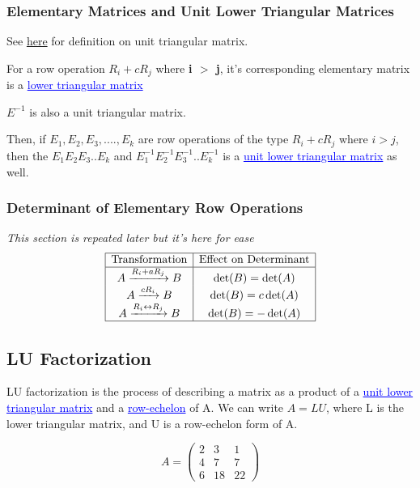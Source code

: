 \documentclass{article}
\newcommand{\bul}[1]{\textcolor{blue}{\underline{#1}}}
\newcommand{\sbreak}{\vspace{10pt}}
\newcommand{\ssbreak}{\vspace{5pt}}
\begin{document}
\subsubsection{Elementary Matrices and Unit Lower Triangular Matrices}
\label{sec:emaultm}
See \hyperref[sec:ultm]{here} for definition on unit triangular matrix.

\sbreak

For a row operation $R_i + cR_j$ where \textbf{i $>$ j}, it's corresponding elementary matrix is a \bul{lower triangular matrix}

\ssbreak

$E^{-1}$ is also a unit triangular matrix.

\ssbreak

Then, if $E_1,E_2,E_3,....,E_k$ are row operations of the type $R_i + cR_j$ where $i>j$, then the $E_1E_2E_3..E_k$ and $E_1^{-1}E_2^{-1}E_3^{-1}..E_k^{-1}$ is a \bul{unit lower triangular matrix} as well.

\subsubsection{Determinant of Elementary Row Operations}
\textit{This section is repeated later but it's here for ease}
\[
\begin{array}{|c|c|}
\hline
\text{Transformation} & \text{Effect on Determinant} \\
\hline
A \xrightarrow{R_i + aR_j} B & \det(B) = \det(A) \\
A \xrightarrow{cR_i} B & \det(B) = c \det(A) \\
A \xrightarrow{R_i \leftrightarrow R_j} B & \det(B) = - \det(A) \\
\hline
\end{array}
\]

\subsection{LU Factorization}
LU factorization is the process of describing a matrix as a product of a \bul{unit lower triangular matrix} and a \bul{row-echelon} of A. We can write $A = LU$, where L is the lower triangular matrix, and U is a row-echelon form of A.


\[
A = \begin{pmatrix}
2 & 3 & 1 \\
4 & 7 & 7 \\
6 & 18 & 22
\end{pmatrix}
\]
\end{document}
